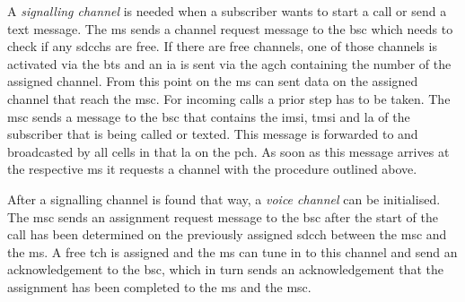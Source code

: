 A \emph{signalling channel} is needed when a subscriber wants to start a call or send a text message.
The \gls{ms} sends a channel request message to the \gls{bsc} which needs to check if any \glspl{sdcch} are free.
If there are free channels, one of those channels is activated via the \gls{bts} and an \gls{ia} is sent via the \gls{agch} containing the number of the assigned channel.
From this point on the \gls{ms} can sent data on the assigned channel that reach the \gls{msc}.
For incoming calls a prior step has to be taken.
The \gls{msc} sends a message to the \gls{bsc} that contains the \gls{imsi}, \gls{tmsi} and \gls{la} of the subscriber that is being called or texted.
This message is forwarded to and broadcasted by all cells in that \gls{la} on the \gls{pch}.
As soon as this message arrives at the respective \gls{ms} it requests a channel with the procedure outlined above.

After a signalling channel is found that way, a \emph{voice channel} can be initialised.
The \gls{msc} sends an assignment request message to the \gls{bsc} after the start of the call has been determined on the previously assigned \gls{sdcch} between the \gls{msc} and the \gls{ms}.
A free \gls{tch} is assigned and the \gls{ms} can tune in to this channel and send an acknowledgement to the \gls{bsc}, which in turn sends an acknowledgement that the assignment has been completed to the \gls{ms} and the \gls{msc}.

